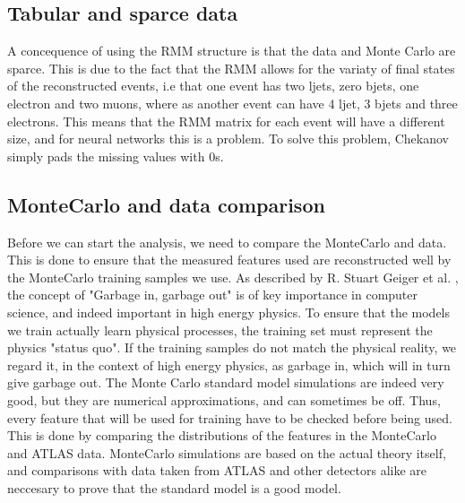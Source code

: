 \subsection*{Tabular and sparce data}
A concequence of using the RMM structure is that the data and Monte Carlo are sparce. This is due to the fact that the RMM allows for 
the variaty of final states of the reconstructed events, i.e that one event has two ljets, zero bjets, one electron and two muons, where as another 
event can have 4 ljet, 3 bjets and three electrons. This means that the RMM matrix for each event will have a different size, 
and for neural networks this is a problem. To solve this problem, Chekanov simply pads the missing values with 0s\cite{Chekanov_2019}. 

\subsection*{MonteCarlo and data comparison}\label{sec:mcdatacomp}

Before we can start the analysis, we need to compare the MonteCarlo and data. This is done to ensure that the measured features used 
are reconstructed well by the MonteCarlo training samples we use. As described by R. Stuart Geiger et al. \cite{DBLP:journals/corr/abs-2107-02278}, the concept of "Garbage 
in, garbage out" is of key importance in computer science, and indeed important in high energy physics. To ensure that the models 
we train actually learn physical processes, the training set must represent the physics "status quo". If the training samples do 
not match the physical reality, we regard it, in the context of high energy physics, as garbage in, which will in turn give 
garbage out. The Monte Carlo standard model simulations are indeed very good, but they are numerical approximations, and can 
sometimes be off. Thus, every feature that will be used for training have to be checked before being used. This is done by 
comparing the distributions of the features in the MonteCarlo and ATLAS data. MonteCarlo simulations are based on the actual theory 
itself, and comparisons with data taken from ATLAS and other detectors alike are neccesary to prove that the standard model is a good model.

